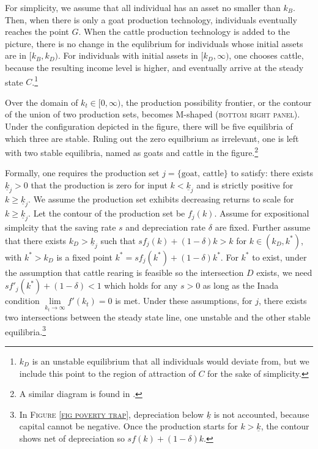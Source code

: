 	For simplicity, we assume that all individual has an asset no smaller than $k_{B}$. Then, when there is only a goat production technology, individuals eventually reaches the point $G$. When the cattle production technology is added to the picture, there is no change in the equlibrium for individuals whose initial assets are in $[k_{B}, k_{D})$. For individuals with initial assets in $[k_{D}, \infty)$, one chooses cattle, because the resulting income level is higher, and eventually arrive at the steady state $C$.\footnote{$k_{D}$ is an unstable equilibrium that all individuals would deviate from, but we include this point to the region of attraction of $C$ for the sake of simplicity. } 

	Over the domain of $k_{t}\in[0, \infty)$, the production possibility frontier, or the contour of the union of two production sets, becomes M-shaped (\textsc{bottom right panel}). Under the configuration depicted in the figure, there will be five equilibria of which three are stable. Ruling out the zero equilbrium as irrelevant, one is left with two stable equilibria, named as goats and cattle in the figure.\footnote{A similar diagram is found in \citet[][Figure 3, with $k-y$ space]{KraayMcKenzie2014}. }

	Formally, one requires the production set $j=\{\mbox{goat, cattle}\}$ to satisfy: there exists $\underline{k}_{j}>0$ that the production is zero for input $k<\underline{k}_{j}$ and is strictly positive for $k\geqslant\underline{k}_{j}$. We assume the production set exhibits decreasing returns to scale for $k\geqslant\underline{k}_{j}$. Let the contour of the production set be $f_{j}(k)$. Assume for expositional simplcity that the saving rate $s$ and depreciation rate $\delta$ are fixed. Further assume that there exists $k_{D}>\underline{k}_{j}$ such that $sf_{j}(k)+(1-\delta)k>k$ for $k\in(k_{D}, k^{*})$, with $k^{*}>k_{D}$ is a fixed point $k^{*}=sf_{j}(k^{*})+(1-\delta)k^{*}$. For $k^{*}$ to exist, under the assumption that cattle rearing is feasible so the intersection $D$ exists, we need $sf'_{j}(k^{*})+(1-\delta)<1$ which holds for any $s>0$ as long as the Inada condition $\lim\limits_{k_{t}\rightarrow \infty} f'(k_{t})=0$ is met. Under these assumptions, for $j$, there exists two intersections between the steady state line, one unstable and the other stable equilibria.\footnote{In \textsc{Figure \ref{fig poverty trap}}, depreciation below $\underline{k}$ is not accounted, because capital cannot be negative. Once the production starts for $k>\underline{k}$, the contour shows net of depreciation so $sf(k)+(1-\delta)k$. } 

